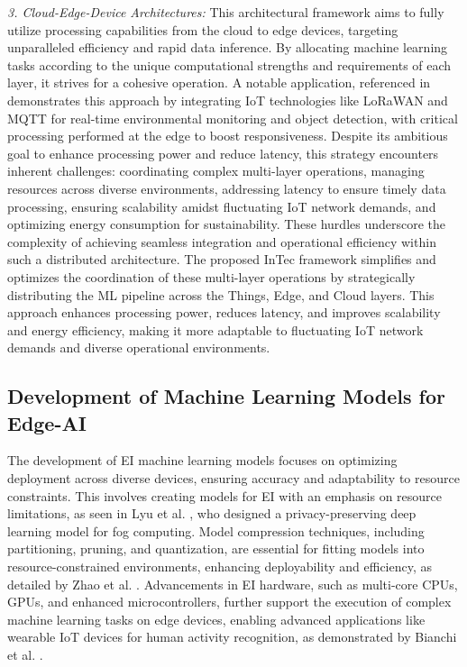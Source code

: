 	
	\textit{3. Cloud-Edge-Device Architectures:} This architectural framework aims to fully utilize processing capabilities from the cloud to edge devices, targeting unparalleled efficiency and rapid data inference. By allocating machine learning tasks according to the unique computational strengths and requirements of each layer, it strives for a cohesive operation. A notable application, referenced in \cite{c31} demonstrates this approach by integrating IoT technologies like LoRaWAN and MQTT for real-time environmental
	monitoring and object detection, with critical processing performed at the edge
	to boost responsiveness. Despite its ambitious goal to enhance processing power
	and reduce latency, this strategy encounters inherent challenges: coordinating
	complex multi-layer operations, managing resources across diverse environments,
	addressing latency to ensure timely data processing, ensuring scalability amidst
	fluctuating IoT network demands, and optimizing energy consumption for sustainability. These hurdles underscore the complexity of achieving seamless integration and operational efficiency within such a distributed architecture. The proposed InTec framework simplifies and optimizes
	the coordination of these multi-layer operations by strategically distributing the
	ML pipeline across the Things, Edge, and Cloud layers. This approach enhances
	processing power, reduces latency, and improves scalability and energy efficiency,
	making it more adaptable to fluctuating IoT network demands and diverse operational environments.
	
	\subsection{Development of Machine Learning Models for Edge-AI} 
	The development of EI machine learning models focuses on optimizing deployment across diverse devices, ensuring accuracy and adaptability to resource constraints. This involves creating models for EI with an emphasis on resource limitations, as seen in Lyu et al. \cite{c38}, who designed a privacy-preserving deep learning model for fog computing. Model compression techniques, including partitioning, pruning, and quantization, are essential for fitting models into resource-constrained environments, enhancing deployability and efficiency, as detailed by Zhao et al. \cite{c26}. Advancements in EI hardware, such as multi-core CPUs, GPUs, and enhanced microcontrollers, further support the execution of complex machine learning tasks on edge devices, enabling advanced applications like wearable IoT devices for human activity recognition, as demonstrated by Bianchi et al. \cite{c36}.